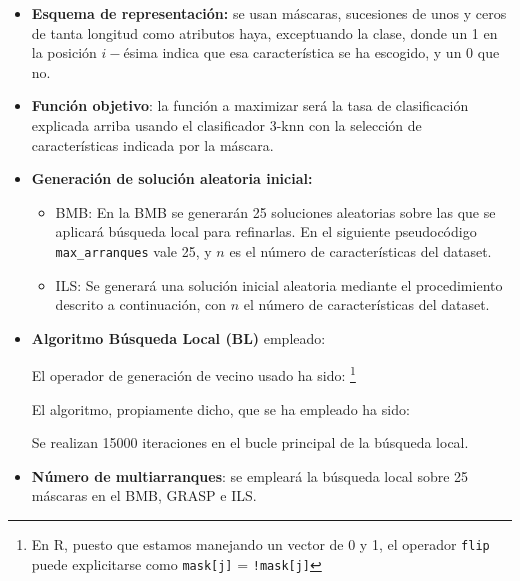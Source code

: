 \documentclass[a4paper,11pt]{article}
\begin{document}
\begin{itemize} 
\item \textbf{Esquema de representación:} se usan máscaras, sucesiones de unos y ceros de tanta longitud como atributos haya,
exceptuando la clase, donde un 1 en la posición $i-$ésima indica que esa característica se ha escogido, y un $0$ que no.

\item \textbf{Función objetivo}: la función a maximizar será la tasa de clasificación explicada arriba usando el clasificador
3-knn con la selección de características indicada por la máscara.\\

\small\texttt{}
\normalsize

\item \textbf{Generación de solución aleatoria inicial: }
  \begin{itemize}
   \item BMB: En la BMB se generarán 25 soluciones aleatorias sobre las que se aplicará búsqueda local para refinarlas.
   En el siguiente pseudocódigo \texttt{max\_arranques} vale 25, y $n$ es el número de características del dataset.\\
   
   \small\texttt{}
   \normalsize
   
   \item ILS: Se generará una solución inicial aleatoria mediante el procedimiento descrito a continuación, con $n$ el
   número de características del dataset.
   
   \small\texttt{}
   \normalsize
    
  \end{itemize}


\item \textbf{Algoritmo Búsqueda Local (BL)} empleado:
  
  El operador de generación de vecino usado ha sido:
  \footnote{En R, puesto que estamos manejando un vector de 0 y 1, el operador \texttt{flip} puede explicitarse como
  \texttt{mask[j]} = \texttt{!mask[j]}}
  
  \small\texttt{}
  \normalsize
  
  
  El algoritmo, propiamente dicho, que se ha empleado ha sido:\\
  
  \small\texttt{}
  
  Se realizan 15000 iteraciones en el bucle principal de la búsqueda local.

\item \textbf{Número de multiarranques}: se empleará la búsqueda local sobre 25 máscaras en el BMB, GRASP e ILS.

\end{itemize}
\end{document}
